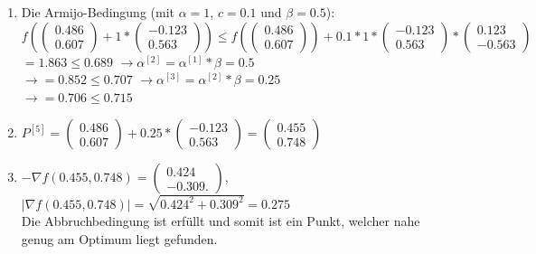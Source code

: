 \documentclass[naustrian]{article}
\begin{document}
{\begin{enumerate}
	$|{\nabla}f(0.486,0.607)| = \sqrt{0.123^2+0.563^2} = 0.332$
	\item
	Die Armijo-Bedingung (mit $\alpha = 1$, $c = 0.1$ und $\beta = 0.5$):\\
	$f( \left( \begin{array}{c} 0.486 \\ 0.607 \end{array} \right) + 1 * \left( \begin{array}{c} -0.123 \\ 0.563 \end{array} \right)) \leq f(\left( \begin{array}{c} 0.486 \\ 0.607 \end{array} \right)) + 0.1 * 1 *  \left( \begin{array}{c} -0.123 \\ 0.563 \end{array} \right) * \left( \begin{array}{c} 0.123 \\ -0.563 \end{array} \right)$ \\
	$= 1.863 \leq 0.689$
	$\rightarrow \alpha^{[2]} = \alpha^{[1]} * \beta = 0.5$ \\
	$\rightarrow = 0.852 \leq 0.707$
	$\rightarrow \alpha^{[3]} = \alpha^{[2]} * \beta = 0.25$ \\
	$\rightarrow = 0.706 \leq 0.715$
	\item
	$P^{[5]} = \left( \begin{array}{c} 0.486 \\ 0.607 \end{array} \right) + 0.25 * \left( \begin{array}{c} -0.123 \\ 0.563 \end{array} \right) = \left( \begin{array}{c} 0.455 \\ 0.748 \end{array} \right)$
    \item
	$-{\nabla}f(0.455,0.748) = \left( \begin{array}{c} 0.424 \\ -0.309. \end{array} \right)$, \\
	$|{\nabla}f(0.455,0.748)| = \sqrt{0.424^2+0.309^2} = 0.275$ \\
	Die Abbruchbedingung ist erfüllt und somit ist ein Punkt, welcher nahe genug am Optimum liegt gefunden.



\end{enumerate}}
\end{document}
